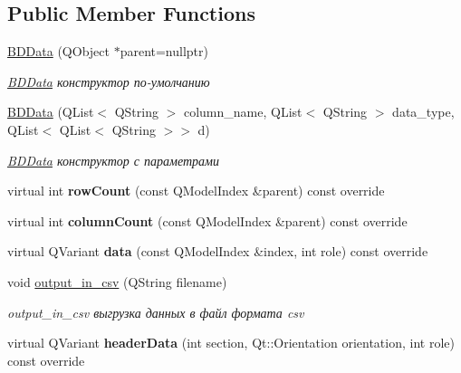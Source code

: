 \subsection*{Public Member Functions}
\begin{DoxyCompactItemize}
\item 
\hyperlink{classBDData_a74a3f4246018e4c20f7af94a92f6933d}{B\+D\+Data} (Q\+Object $\ast$parent=nullptr)
\begin{DoxyCompactList}\small\item\em \hyperlink{classBDData}{B\+D\+Data} конструктор по-\/умолчанию \end{DoxyCompactList}\item 
\hyperlink{classBDData_a7740b599addc9dc7cbcaa6e91bf9b494}{B\+D\+Data} (Q\+List$<$ Q\+String $>$ column\+\_\+name, Q\+List$<$ Q\+String $>$ data\+\_\+type, Q\+List$<$ Q\+List$<$ Q\+String $>$$>$ d)
\begin{DoxyCompactList}\small\item\em \hyperlink{classBDData}{B\+D\+Data} конструктор с параметрами \end{DoxyCompactList}\item 
virtual int {\bfseries row\+Count} (const Q\+Model\+Index \&parent) const override\hypertarget{classBDData_ae495986578e0792cbfa1a6258e55c6de}{}\label{classBDData_ae495986578e0792cbfa1a6258e55c6de}

\item 
virtual int {\bfseries column\+Count} (const Q\+Model\+Index \&parent) const override\hypertarget{classBDData_aa4076a54b708c58eddb1099fc69d7f12}{}\label{classBDData_aa4076a54b708c58eddb1099fc69d7f12}

\item 
virtual Q\+Variant {\bfseries data} (const Q\+Model\+Index \&index, int role) const override\hypertarget{classBDData_aa6c96754950993deadf8dce9177b907d}{}\label{classBDData_aa6c96754950993deadf8dce9177b907d}

\item 
void \hyperlink{classBDData_a33abf96338be98b03c7f2ecac6acd46e}{output\+\_\+in\+\_\+csv} (Q\+String filename)
\begin{DoxyCompactList}\small\item\em output\+\_\+in\+\_\+csv выгрузка данных в файл формата csv \end{DoxyCompactList}\item 
virtual Q\+Variant {\bfseries header\+Data} (int section, Qt\+::\+Orientation orientation, int role) const override\hypertarget{classBDData_ad1a7c5117f233b7805e6a72edc857db5}{}\label{classBDData_ad1a7c5117f233b7805e6a72edc857db5}


\end{DoxyCompactItemize}
